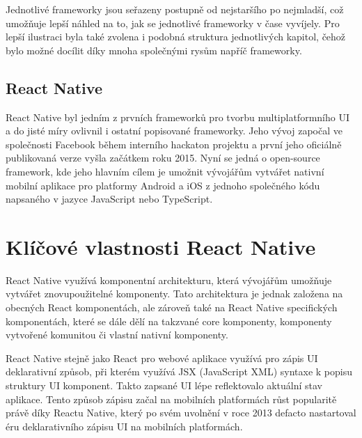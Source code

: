 Jednotlivé frameworky jsou seřazeny postupně od nejstaršího
po nejmladší, což umožňuje lepší náhled na to, jak se jednotlivé frameworky v čase vyvíjely. Pro lepší ilustraci byla také zvolena 
i podobná struktura jednotlivých kapitol, čehož bylo možné docílit díky mnoha společnými rysům napříč frameworky.

\subsection{React Native}
React Native byl jedním z prvních frameworků pro tvorbu multiplatformního UI a do jisté míry ovlivnil i ostatní popisované
frameworky. Jeho vývoj započal ve společnosti Facebook během interního hackaton projektu a první jeho oficiálně publikovaná
verze vyšla začátkem roku 2015. \cite{reactNativeHistory}
Nyní se jedná o open-source framework, kde jeho hlavním cílem je umožnit vývojářům vytvářet nativní mobilní aplikace 
pro platformy Android a iOS z jednoho společného kódu napsaného v jazyce JavaScript nebo TypeScript.

\section*{Klíčové vlastnosti React Native}

React Native využívá komponentní architekturu, která vývojářům umožňuje 
vytvářet znovupoužitelné komponenty. \cite{reactNativeComponents} Tato architektura je jednak založena na obecných
React komponentách, ale zároveň také na React Native specifických komponentách, které se dále dělí na takzvané core
komponenty, komponenty vytvořené komunitou či vlastní nativní komponenty. \cite{reactNativeComponents}

    
React Native stejně jako React pro webové aplikace využívá pro zápis UI deklarativní způsob, 
při kterém využívá JSX (JavaScript XML) syntaxe k popisu struktury UI komponent. \cite{reactNativeJSX}
Takto zapsané UI lépe reflektovalo aktuální stav aplikace.
Tento způsob zápisu začal na mobilních platformách růst popularitě právě díky Reactu Native, který po svém uvolnění v roce 2013 
defacto nastartoval éru deklarativního zápisu UI na mobilních platformách. \cite{declarativeUIHistory}

